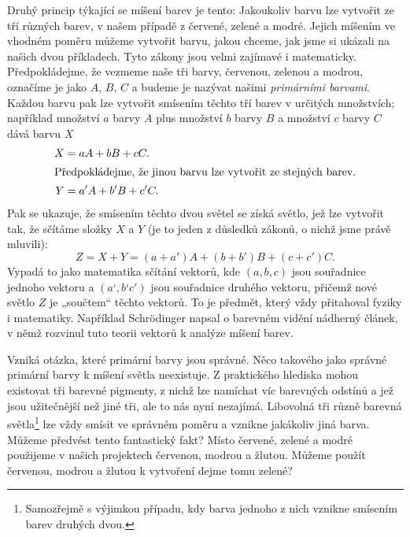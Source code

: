 {    Druhý princip týkající se míšení barev je tento: Jakoukoliv barvu lze vytvořit ze tří různých 
    barev, v našem případě z červené, zelené a modré. Jejich míšením ve vhodném poměru můžeme 
    vytvořit barvu, jakou chceme, jak jsme si ukázali na našich dvou příkladech. Tyto zákony jsou 
    velmi zajímavé i matematicky. Předpokládejme, že vezmeme naše tři barvy, červenou, zelenou a 
    modrou, označíme je jako \(A\), \(B\), \(C\) a budeme je nazývat našimi \emph{primárními 
    barvami}. Každou barvu pak lze vytvořit smísením těchto tří barev v určitých množstvích; 
    například množství \(a\) barvy \(A\) plus množství \(b\) barvy \(B\) a množství \(c\) barvy 
    \(C\) dává barvu \(X\)
    \begin{align}
      X &= aA + bB + cC.     \label{FYZ:eq231}     \\
      \shortintertext{Předpokládejme, že jinou barvu lze vytvořit ze stejných barev.}
      Y &= a'A + b'B + c'C.  \label{FYZ:eq232}
    \end{align}
    Pak se ukazuje, že smísením těchto dvou světel se získá světlo, jež lze vytvořit tak, že 
    sčítáme složky \(X\) a \(Y\) (je to jeden z důsledků zákonů, o nichž jsme právě mluvili):
    \begin{equation}\label{FYZ:eq233}
      Z = X + Y = (a+a')A + (b+b')B + (c+c')C.
    \end{equation}
    Vypadá to jako matematika sčítání vektorů, kde \((a, b, c)\) jsou souřadnice jednoho vektoru a 
    \((a‘, b‘ c')\) jsou souřadnice druhého vektoru, přičemž nové světlo \(Z\) je „součtem“ těchto 
    vektorů. To je předmět, který vždy přitahoval fyziky i matematiky. Například Schr{\"o}dinger 
    napsal o barevném vidění nádherný článek, v němž rozvinul tuto teorii vektorů k analýze míšení 
    barev.
    
    Vzniká otázka, které primární barvy jsou správné. Něco takového jako správné primární barvy k 
    míšení světla neexistuje. Z praktického hlediska mohou existovat tři barevné pigmenty, z nichž 
    lze namíchat víc barevných odstínů a jež jsou užitečnější než jiné tři, ale to nás nyní 
    nezajímá. Libovolná tři různě barevná světla\footnote{ Samozřejmě s výjimkou případu, kdy barva 
    jednoho z nich vznikne smísením barev druhých dvou. } lze vždy smísit ve správném poměru a 
    vznikne jakákoliv jiná barva. Můžeme předvést tento fantastický fakt? Místo červené, zelené a 
    modré použijeme v našich projektech červenou, modrou a žlutou. Můžeme použít červenou, modrou a 
    žlutou k vytvoření dejme tomu zelené?
    
}
